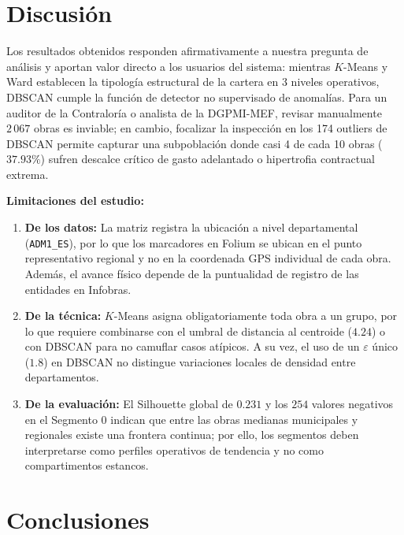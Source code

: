 \documentclass[conference]{IEEEtran}
\begin{document}
\section{Discusi\'on}

Los resultados obtenidos responden afirmativamente a nuestra pregunta de an\'alisis y aportan valor directo a los usuarios del sistema: mientras $K$-Means y Ward establecen la tipolog\'ia estructural de la cartera en 3 niveles operativos, DBSCAN cumple la funci\'on de detector no supervisado de anomal\'ias. Para un auditor de la Contralor\'ia o analista de la DGPMI-MEF, revisar manualmente $2\,067$ obras es inviable; en cambio, focalizar la inspecci\'on en los 174 outliers de DBSCAN permite capturar una subpoblaci\'on donde casi 4 de cada 10 obras ($37.93\%$) sufren descalce cr\'itico de gasto adelantado o hipertrofia contractual extrema.

\textbf{Limitaciones del estudio:}
\begin{enumerate}
    \item \textbf{De los datos:} La matriz registra la ubicaci\'on a nivel departamental (\texttt{ADM1\_ES}), por lo que los marcadores en Folium se ubican en el punto representativo regional y no en la coordenada GPS individual de cada obra. Adem\'as, el avance f\'isico depende de la puntualidad de registro de las entidades en Infobras.
    \item \textbf{De la t\'ecnica:} $K$-Means asigna obligatoriamente toda obra a un grupo, por lo que requiere combinarse con el umbral de distancia al centroide ($4.24$) o con DBSCAN para no camuflar casos at\'ipicos. A su vez, el uso de un $\varepsilon$ \'unico ($1.8$) en DBSCAN no distingue variaciones locales de densidad entre departamentos.
    \item \textbf{De la evaluaci\'on:} El Silhouette global de $0.231$ y los $254$ valores negativos en el Segmento 0 indican que entre las obras medianas municipales y regionales existe una frontera continua; por ello, los segmentos deben interpretarse como perfiles operativos de tendencia y no como compartimentos estancos.
\end{enumerate}

\section{Conclusiones}
\end{document}
